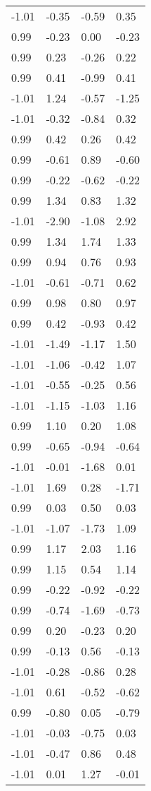 \documentclass[
  doc,draftall]{apa6}
\begin{document}
\begin{table}[tbp]
\begin{center}
\begin{threeparttable}
\begin{tabular}{llll}
-1.01 & -0.35 & -0.59 & 0.35\\
0.99 & -0.23 & 0.00 & -0.23\\
0.99 & 0.23 & -0.26 & 0.22\\
0.99 & 0.41 & -0.99 & 0.41\\
-1.01 & 1.24 & -0.57 & -1.25\\
-1.01 & -0.32 & -0.84 & 0.32\\
0.99 & 0.42 & 0.26 & 0.42\\
0.99 & -0.61 & 0.89 & -0.60\\
0.99 & -0.22 & -0.62 & -0.22\\
0.99 & 1.34 & 0.83 & 1.32\\
-1.01 & -2.90 & -1.08 & 2.92\\
0.99 & 1.34 & 1.74 & 1.33\\
0.99 & 0.94 & 0.76 & 0.93\\
-1.01 & -0.61 & -0.71 & 0.62\\
0.99 & 0.98 & 0.80 & 0.97\\
0.99 & 0.42 & -0.93 & 0.42\\
-1.01 & -1.49 & -1.17 & 1.50\\
-1.01 & -1.06 & -0.42 & 1.07\\
-1.01 & -0.55 & -0.25 & 0.56\\
-1.01 & -1.15 & -1.03 & 1.16\\
0.99 & 1.10 & 0.20 & 1.08\\
0.99 & -0.65 & -0.94 & -0.64\\
-1.01 & -0.01 & -1.68 & 0.01\\
-1.01 & 1.69 & 0.28 & -1.71\\
0.99 & 0.03 & 0.50 & 0.03\\
-1.01 & -1.07 & -1.73 & 1.09\\
0.99 & 1.17 & 2.03 & 1.16\\
0.99 & 1.15 & 0.54 & 1.14\\
0.99 & -0.22 & -0.92 & -0.22\\
0.99 & -0.74 & -1.69 & -0.73\\
0.99 & 0.20 & -0.23 & 0.20\\
0.99 & -0.13 & 0.56 & -0.13\\
-1.01 & -0.28 & -0.86 & 0.28\\
-1.01 & 0.61 & -0.52 & -0.62\\
0.99 & -0.80 & 0.05 & -0.79\\
-1.01 & -0.03 & -0.75 & 0.03\\
-1.01 & -0.47 & 0.86 & 0.48\\
-1.01 & 0.01 & 1.27 & -0.01\\

\end{tabular}
\end{threeparttable}
\end{center}
\end{table}
\end{document}

